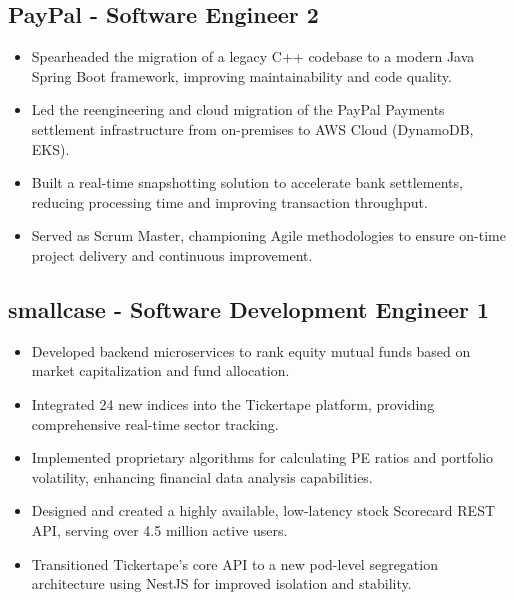 \documentclass[11pt]{article}
\begin{document}
\subsection{\textbf{PayPal} - Software Engineer 2  }
\begin{itemize}
	\item Spearheaded the migration of a legacy C++ codebase to a modern Java Spring Boot framework, improving maintainability and code quality.
	\item Led the reengineering and cloud migration of the PayPal Payments settlement infrastructure from on-premises to AWS Cloud (DynamoDB, EKS).
    \item Built a real-time snapshotting solution to accelerate bank settlements, reducing processing time and improving transaction throughput.
    \item Served as Scrum Master, championing Agile methodologies to ensure on-time project delivery and continuous improvement.
\end{itemize}

\subsection{\textbf{smallcase} - Software Development Engineer 1  }
\begin{itemize}
    \item Developed backend microservices to rank equity mutual funds based on market capitalization and fund allocation.
    \item Integrated 24 new indices into the Tickertape platform, providing comprehensive real-time sector tracking.
    \item Implemented proprietary algorithms for calculating PE ratios and portfolio volatility, enhancing financial data analysis capabilities.
    \item Designed and created a highly available, low-latency stock Scorecard REST API, serving over 4.5 million active users.
    \item Transitioned Tickertape’s core API to a new pod-level segregation architecture using NestJS for improved isolation and stability.
\end{itemize}
\end{document}
